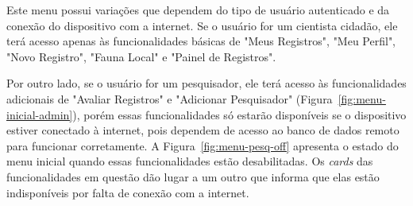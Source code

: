 Este menu possui variações que dependem do tipo de usuário autenticado e da conexão do 
dispositivo com a internet. Se o usuário for um cientista cidadão, ele terá acesso apenas às funcionalidades 
básicas de "Meus Registros", "Meu Perfil", "Novo Registro", "Fauna Local" e "Painel de Registros".

Por outro lado, se o usuário for um pesquisador, ele terá acesso às funcionalidades adicionais 
de "Avaliar Registros" e "Adicionar Pesquisador" (Figura~\ref{fig:menu-inicial-admin}), porém essas 
funcionalidades só estarão disponíveis se o dispositivo estiver conectado à internet, 
pois dependem de acesso ao banco de dados remoto para funcionar corretamente. A Figura~\ref{fig:menu-pesq-off}
apresenta o estado do menu inicial quando essas funcionalidades estão desabilitadas. Os \textit{cards}
das funcionalidades em questão dão lugar a um outro que informa que elas estão indisponíveis por 
falta de conexão com a internet.

